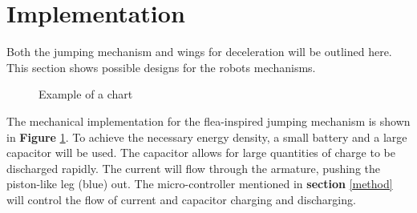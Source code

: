 \section{Implementation} 
\label{implementation}

Both the jumping mechanism and wings for deceleration will be outlined here. This section shows possible designs for the robots mechanisms.\\

\begin{figure}[H]
\begin{center}
\caption{Example of a chart}
\label{fig:jumpMech}
\end{center}
\end{figure} 

\indent The mechanical implementation for the flea-inspired jumping mechanism is shown in \textbf{Figure} \ref{fig:jumpMech}. To achieve the necessary energy density, a small battery and a large capacitor will be used. The capacitor allows for large quantities of charge to be discharged rapidly. The current will flow through the armature, pushing the piston-like leg (blue) out. The micro-controller mentioned in \textbf{section} \ref{method} will control the flow of current and capacitor charging and discharging. \\

